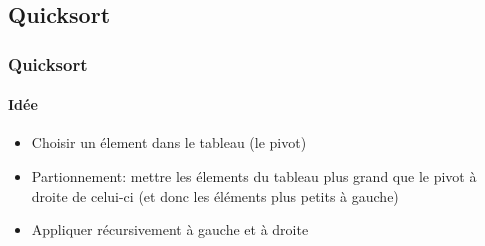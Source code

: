 \subsection[Quick]{Quicksort}

\begin{frame}
\frametitle{Quicksort}
\framesubtitle{Idée}
\begin{itemize}
\item Choisir un élement dans le tableau (le pivot)
\item Partionnement: mettre les élements du tableau plus grand que le pivot à droite de celui-ci (et donc les éléments plus petits à gauche)
\item Appliquer récursivement à gauche et à droite
\end{itemize}
\end{frame}

